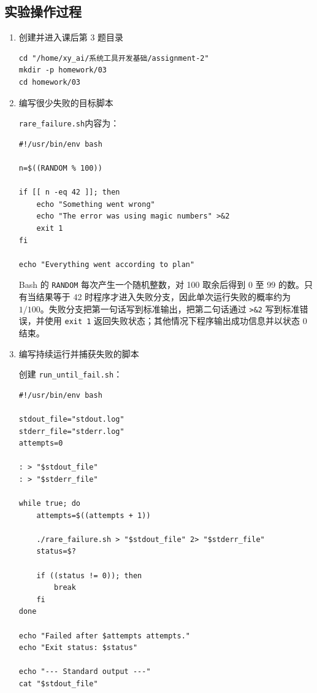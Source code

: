 \documentclass[a4paper,12pt]{report}
\begin{document}
\subsection{实验操作过程}
\begin{enumerate}
  \item {\large 创建并进入课后第 3 题目录}



\begin{lstlisting}
cd "/home/xy_ai/系统工具开发基础/assignment-2"
mkdir -p homework/03
cd homework/03
\end{lstlisting}

  \item {\large 编写很少失败的目标脚本}

  \texttt{rare\_failure.sh}内容为：

\begin{lstlisting}
#!/usr/bin/env bash

n=$((RANDOM % 100))

if [[ n -eq 42 ]]; then
    echo "Something went wrong"
    echo "The error was using magic numbers" >&2
    exit 1
fi

echo "Everything went according to plan"
\end{lstlisting}

  Bash 的 \texttt{RANDOM} 每次产生一个随机整数，对 100 取余后得到 0 至 99 的数。只有当结果等于 42 时程序才进入失败分支，因此单次运行失败的概率约为 $1/100$。失败分支把第一句话写到标准输出，把第二句话通过 \texttt{>\&2} 写到标准错误，并使用 \texttt{exit 1} 返回失败状态；其他情况下程序输出成功信息并以状态 0 结束。

  \item {\large 编写持续运行并捕获失败的脚本}

  创建 \texttt{run\_until\_fail.sh}：

\begin{lstlisting}
#!/usr/bin/env bash

stdout_file="stdout.log"
stderr_file="stderr.log"
attempts=0

: > "$stdout_file"
: > "$stderr_file"

while true; do
    attempts=$((attempts + 1))

    ./rare_failure.sh > "$stdout_file" 2> "$stderr_file"
    status=$?

    if ((status != 0)); then
        break
    fi
done

echo "Failed after $attempts attempts."
echo "Exit status: $status"

echo "--- Standard output ---"
cat "$stdout_file"


\end{lstlisting}
\end{enumerate}
\end{document}
